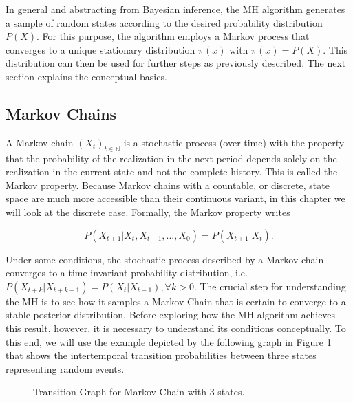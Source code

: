 \documentclass[12pt,english,a4paper,oneside]{article}
\theoremstyle{definition}
\theoremstyle{definition}
\theoremstyle{definition}
\theoremstyle{definition}
\theoremstyle{remark}
\begin{document}
\noindent
In general and abstracting from Bayesian inference, the MH algorithm generates a sample of random states according to the desired probability distribution \(P(X)\). For this purpose, the algorithm employs a Markov process that converges to a unique stationary distribution \(\pi(x)\) with \(\pi(x)=P(X)\). This distribution can then be used for further steps as previously described. The next section explains the conceptual basics.

\hypertarget{markov-chains}{%
\subsection{Markov Chains}\label{markov-chains}}

A Markov chain \((X_t)_{t \in \mathbb{N}}\) is a stochastic process (over time) with the property that the probability of the realization in the next period depends solely on the realization in the current state and not the complete history. This is called the Markov property. Because Markov chains with a countable, or discrete, state space are much more accessible than their continuous variant, in this chapter we will look at the discrete case. Formally, the Markov property writes

\begin{equation}
\label{eq:markov-property}
P(X_{t+1} |X_{t}, X_{t-1}, ..., X_{0}) = P(X_{t+1} |X_{t}).
\end{equation}

\noindent
Under some conditions, the stochastic process described by a Markov chain converges to a time-invariant probability distribution, i.e.~\(P(X_{t+k} |X_{t+k-1}) = P(X_{t} |X_{t-1}), \forall k>0\). The crucial step for understanding the MH is to see how it samples a Markov Chain that is certain to converge to a stable posterior distribution. Before exploring how the MH algorithm achieves this result, however, it is necessary to understand its conditions conceptually. To this end, we will use the example depicted by the following graph in Figure 1 that shows the intertemporal transition probabilities between three states representing random events.

\begin{figure}[H]
\label{fig:ex1}


\centering


\caption{Transition Graph for Markov Chain with 3 states.}
\end{figure}
\end{document}
